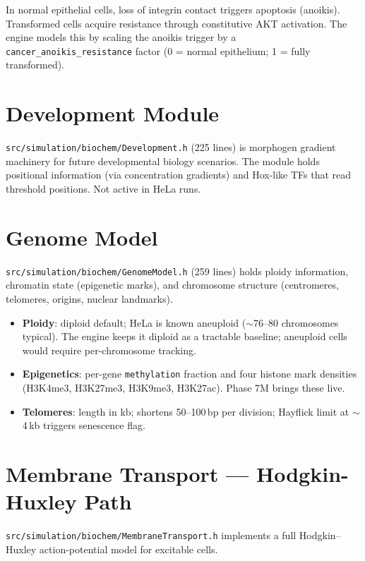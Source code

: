 \documentclass[11pt,letterpaper,twoside,openany]{book}
\newcommand{\code}[1]{\texttt{#1}}
\newcommand{\file}[1]{\texttt{\small#1}}
\begin{document}
In normal epithelial cells, loss of integrin contact triggers
apoptosis (anoikis). Transformed cells acquire resistance through
constitutive AKT activation. The engine models this by scaling the
anoikis trigger by a \code{cancer\_anoikis\_resistance} factor (0 =
normal epithelium; 1 = fully transformed).

\chapter{Development Module}
\label{ch:development}

\file{src/simulation/biochem/Development.h} (225 lines) is
morphogen gradient machinery for future developmental biology
scenarios. The module holds positional information (via
concentration gradients) and Hox-like TFs that read threshold
positions. Not active in HeLa runs.

\chapter{Genome Model}
\label{ch:genome-model}

\file{src/simulation/biochem/GenomeModel.h} (259 lines) holds
ploidy information, chromatin state (epigenetic marks), and
chromosome structure (centromeres, telomeres, origins, nuclear
landmarks).

\begin{itemize}
  \item \textbf{Ploidy}: diploid default; HeLa is known aneuploid
        ($\sim$76--80 chromosomes typical). The engine keeps it
        diploid as a tractable baseline; aneuploid cells would
        require per-chromosome tracking.
  \item \textbf{Epigenetics}: per-gene \code{methylation} fraction
        and four histone mark densities (H3K4me3, H3K27me3,
        H3K9me3, H3K27ac). Phase 7M brings these live.
  \item \textbf{Telomeres}: length in kb; shortens 50--100\,bp per
        division; Hayflick limit at $\sim$4\,kb triggers
        senescence flag.
\end{itemize}

\chapter{Membrane Transport --- Hodgkin-Huxley Path}
\label{ch:hh}

\file{src/simulation/biochem/MembraneTransport.h} implements a full
Hodgkin--Huxley action-potential model for excitable cells.
\end{document}
